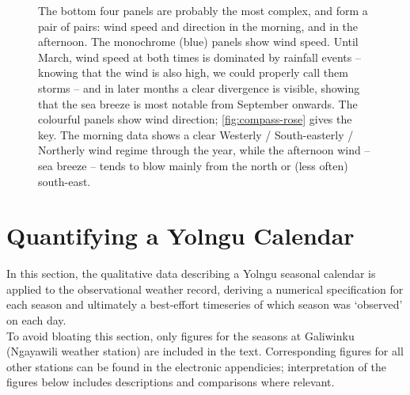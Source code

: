 \begin{figure}[p]
\begin{framed}
    The bottom four panels are probably the most complex, and form a pair of
    pairs: wind speed and direction in the morning, and in the afternoon.
    The monochrome (blue) panels show wind speed.  Until March, wind speed at
    both times is dominated by rainfall events -- knowing that the wind is also
    high, we could properly call them storms -- and in later months a clear
    divergence is visible, showing that the sea breeze is most notable from
    September onwards.
    The colourful panels show wind direction; \cref{fig:compass-rose} gives
    the key.  The morning data shows a clear Westerly / South-easterly / Northerly
    wind regime through the year, while the afternoon wind -- sea breeze --
    tends to blow mainly from the north or (less often) south-east.
\end{framed}
\end{figure}

\checkoddpage\ifoddpage\else\ObservationMultipanels\fi


\section{Quantifying a Yolngu Calendar}
\label{sec:applying-seasons-method}


In this section, the qualitative data describing a Yolngu seasonal
calendar is applied to the observational weather record, deriving
a numerical specification for each season and ultimately a best-effort
timeseries of which season was `observed' on each day.\\

To avoid bloating this section, only figures for the seasons at Galiwinku
(Ngayawili weather station) are included in the text.  Corresponding
figures for all other stations can be found in the electronic appendicies;
interpretation of the figures below includes descriptions and comparisons
where relevant.

